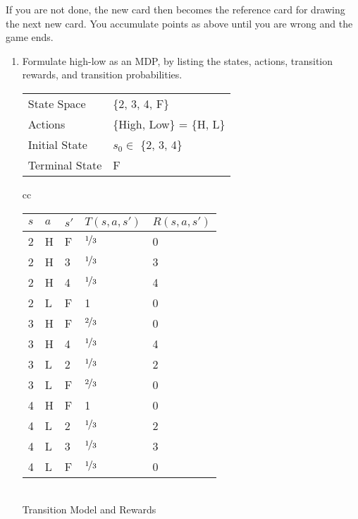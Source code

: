 \documentclass[12pt]{article}
\begin{document}
\noindent
If you are not done, the new card then becomes the reference card for
drawing the next new card.  You accumulate points as above until you
are wrong and the game ends.

\begin{enumerate}

\item Formulate high-low as an MDP, by listing the states, actions,
  transition rewards, and transition probabilities.  

  \begin{flushleft}
  \begin{tabular}{ll}
  State Space & \{2, 3, 4, F\}\\
  Actions     & \{High, Low\} = \{H, L\} \\
  Initial State &  $s_0 \in $ \{2, 3, 4\} \\
  Terminal State & F 
  \end{tabular}
  \end{flushleft}

  \begin{center}
  \begin{tabular}{cc}
  \begin{tabular}{|l|l|l|l|l|} \hline
  $s$        & $a$  & $s'$       & $T(s,a,s')$ & $R(s,a,s')$ \\ \hline
  2 & H & F & $\nicefrac{1}{3}$ & 0 \\ \hline
  2 & H & 3 & $\nicefrac{1}{3}$ & 3 \\ \hline
  2 & H & 4 & $\nicefrac{1}{3}$ & 4 \\ \hline
  2 & L & F & 1 & 0 \\ \hline
  3 & H & F & $\nicefrac{2}{3}$ & 0\\ \hline
  3 & H & 4 & $\nicefrac{1}{3}$ & 4 \\ \hline
  3 & L & 2 & $\nicefrac{1}{3}$ & 2 \\ \hline
  3 & L & F & $\nicefrac{2}{3}$ & 0 \\ \hline
  4 & H & F & 1 & 0 \\ \hline
  4 & L & 2 & $\nicefrac{1}{3}$ & 2 \\ \hline
  4 & L & 3 & $\nicefrac{1}{3}$ & 3 \\ \hline
  4 & L & F & $\nicefrac{1}{3}$ & 0 \\ \hline
  \end{tabular} \\
  Transition Model and Rewards
  \end{tabular}
  \end{center}
  


\end{enumerate}
\end{document}

